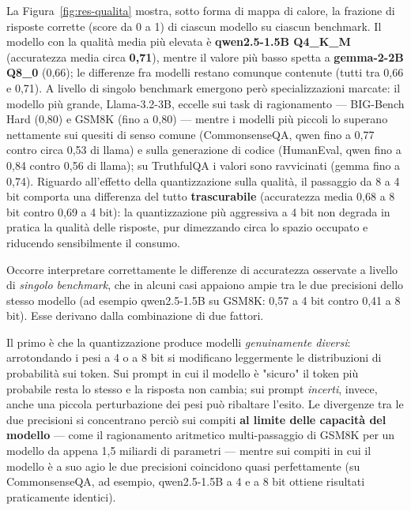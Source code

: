 La Figura~\ref{fig:res-qualita} mostra, sotto forma di mappa di calore, la
frazione di risposte corrette (score da 0 a 1) di ciascun modello su ciascun
benchmark. Il modello con la qualità media più elevata è \textbf{qwen2.5-1.5B
Q4\_K\_M} (accuratezza media circa \textbf{0,71}), mentre il valore più basso
spetta a \textbf{gemma-2-2B Q8\_0} (0,66); le differenze fra modelli restano
comunque contenute (tutti tra 0,66 e 0,71). A livello di singolo benchmark
emergono però specializzazioni marcate: il modello più grande, Llama-3.2-3B,
eccelle sui task di ragionamento --- BIG-Bench Hard (0,80) e GSM8K (fino a 0,80)
--- mentre i modelli più piccoli lo superano nettamente sui quesiti di senso
comune (CommonsenseQA, qwen fino a 0,77 contro circa 0,53 di llama) e sulla
generazione di codice (HumanEval, qwen fino a 0,84 contro 0,56 di llama); su
TruthfulQA i valori sono ravvicinati (gemma fino a 0,74). Riguardo all'effetto
della quantizzazione sulla qualità, il passaggio da 8 a 4 bit comporta una
differenza del tutto \textbf{trascurabile} (accuratezza media 0,68 a 8 bit contro
0,69 a 4 bit): la quantizzazione più aggressiva a 4 bit non degrada in pratica la
qualità delle risposte, pur dimezzando circa lo spazio occupato e riducendo
sensibilmente il consumo.

Occorre interpretare correttamente le differenze di accuratezza osservate a livello di
\emph{singolo benchmark}, che in alcuni casi appaiono ampie tra le due precisioni dello
stesso modello (ad esempio qwen2.5-1.5B su GSM8K: 0,57 a 4 bit contro 0,41 a 8 bit).
Esse derivano dalla combinazione di due fattori.

Il primo è che la quantizzazione produce modelli \emph{genuinamente diversi}:
arrotondando i pesi a 4 o a 8 bit si modificano leggermente le distribuzioni di
probabilità sui token. Sui prompt in cui il modello è "sicuro" il token più probabile
resta lo stesso e la risposta non cambia; sui prompt \emph{incerti}, invece, anche una
piccola perturbazione dei pesi può ribaltare l'esito. Le divergenze tra le due
precisioni si concentrano perciò sui compiti \textbf{al limite delle capacità del
modello} --- come il ragionamento aritmetico multi-passaggio di GSM8K per un modello da
appena 1,5 miliardi di parametri --- mentre sui compiti in cui il modello è a suo agio
le due precisioni coincidono quasi perfettamente (su CommonsenseQA, ad esempio,
qwen2.5-1.5B a 4 e a 8 bit ottiene risultati praticamente identici).


